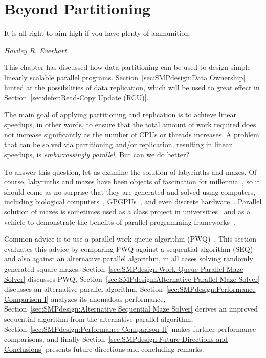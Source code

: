 
\section{Beyond Partitioning}
\label{sec:SMPdesign:Beyond Partitioning}
%
\epigraph{It is all right to aim high if you have plenty of ammunition.}
	 {\emph{Hawley R. Everhart}}

This chapter has discussed how data partitioning can be used to design
simple linearly scalable parallel programs.
Section~\ref{sec:SMPdesign:Data Ownership} hinted at the possibilities
of data replication, which will be used to great effect in
Section~\ref{sec:defer:Read-Copy Update (RCU)}.

The main goal of applying partitioning and replication is to achieve
linear speedups, in other words, to ensure that the total amount of
work required does not increase significantly as the number of CPUs
or threads increases.
A problem that can be solved via partitioning and/or replication,
resulting in linear speedups, is \emph{embarrassingly parallel}.
But can we do better?

To answer this question, let us examine the solution of
labyrinths and mazes.
Of course, labyrinths and mazes have been objects of fascination for
millennia~\cite{WikipediaLabyrinth},
so it should come as no surprise that they are generated and solved
using computers, including biological
computers~\cite{AndrewAdamatzky2011SlimeMold},
GPGPUs~\cite{ChristerEricson2008GPUMaze}, and even
discrete hardware~\cite{MIT:TRMag:MemristorMazes}.
Parallel solution of mazes is sometimes used as a class project in
universities~\cite{ETHZurich:FS2011maze,UMD:CMSC433maze} and
as a vehicle to demonstrate the benefits of parallel-programming
frameworks~\cite{RonFosner2010maze}.

Common advice is to use a parallel work-queue algorithm
(PWQ)~\cite{ETHZurich:FS2011maze,RonFosner2010maze}.
This section evaluates this advice by comparing PWQ
against a sequential algorithm (SEQ) and also against
an alternative parallel algorithm, in all cases solving randomly generated
square mazes.
Section~\ref{sec:SMPdesign:Work-Queue Parallel Maze Solver} discusses PWQ,
Section~\ref{sec:SMPdesign:Alternative Parallel Maze Solver} discusses an alternative
parallel algorithm,
Section~\ref{sec:SMPdesign:Performance Comparison I} analyzes its anomalous performance,
Section~\ref{sec:SMPdesign:Alternative Sequential Maze Solver} derives an improved
sequential algorithm from the alternative parallel algorithm,
Section~\ref{sec:SMPdesign:Performance Comparison II} makes further performance
comparisons,
and finally
Section~\ref{sec:SMPdesign:Future Directions and Conclusions}
presents future directions and concluding remarks.

